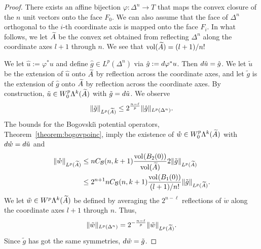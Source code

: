 \documentclass[10pt,a4paper]{article}
\begin{document}
\begin{proof}
    There exists an affine bijection $\varphi : \Delta^n \rightarrow T$ 
    that maps the convex closure of the $n$ unit vectors onto the face $F_0$.
    We can also assume that the face of $\Delta^n$
    orthogonal to the $i$-th coordinate axis is mapped 
    onto the face $F_i$. 
    In what follows, we let $\widetilde {A}$ be the convex set obtained from reflecting $\Delta^n$ along the coordinate axes $l+1$ through $n$. 
    We see that $\operatorname{vol}(\widetilde {A}) = (l+1)/n!$
    
    We let $\hat u := \varphi^{\ast} u$ and define $\hat g \in L^{p}(\Delta^n)$ via $\hat g := d \varphi^{\ast} u$. 
    Then $d \hat u = \hat g$. 
    We let $\tilde u$ be the extension of $\hat u$ onto $\widetilde {A}$ by reflection across the coordinate axes,
    and let $\tilde g$ is the extension of $\hat g$ onto $\widetilde {A}$ by reflection across the coordinate axes. 
    By construction, $\tilde u \in W^{p}_{0}\Lambda^{k}(\widetilde {A})$ with $\tilde g = d \tilde u$.
    We observe 
    \begin{align*}
        \| \tilde g \|_{L^{p}(\widetilde {A})}
        \leq 
        2^{\frac {n-\ell} p}
        \| \hat g \|_{L^{p}(\Delta^n)}
        .
    \end{align*}
    \color{red}
    The bounds for the Bogovski\u{\i} potential operators, Theorem~\ref{theorem:bogovpoinc}, imply 
    the existence of $\mathring w \in W^{p}_{0}\Lambda^{k}(\widetilde {A})$
    with $d \mathring w = d \tilde u$ and 
    \begin{align*}
        \| \mathring w \|_{L^{p}(\widetilde {A})}
        &\leq 
        n C_{{\mathcal B}}(n,k+1) \frac{ \operatorname{vol}_{}(B_2(0)) }{ \operatorname{vol}(\widetilde {A}) } 
        2
        \| \tilde g \|_{L^{p}(\widetilde {A})}
        \\&\leq 
        2^{n+1} n C_{{\mathcal B}}(n,k+1) \frac{ \operatorname{vol}_{}(B_1(0)) }{ (l+1)/n! } 
        \| \tilde g \|_{L^{p}(\widetilde {A})}
        .
    \end{align*}
    \color{blue}
    We let $\tilde w \in W^{p}\Lambda^{k}(\widetilde {A})$ be defined by averaging the $2^{n - \ell}$ reflections of $\mathring w$ along the coordinate axes $l+1$ through $n$. Thus,
    \begin{align*}
        \| \tilde w \|_{L^{p}(\Delta^{n})}
        =
        2^{-\frac{n-\ell}{p}}
        \| \tilde w \|_{L^{p}(\widetilde {A})}
        .
    \end{align*}
    Since $\tilde g$ has got the same symmetries, $d \tilde w = \tilde g$.
    \color{black}
    

\end{proof}
\end{document}
